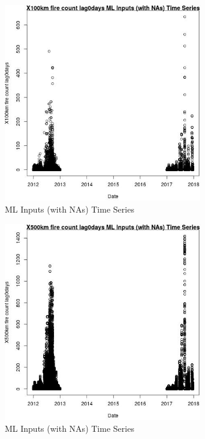 \begin{figure} 
\centering  
\includegraphics[width=0.77\textwidth]{Code_Outputs/Report_ML_input_PM25_Step4_part_e_de_duplicated_aves_compiled_2019-05-14wNAs_X100km_fire_count_lag0daysvDate.jpg} 
\caption{\label{fig:Report_ML_input_PM25_Step4_part_e_de_duplicated_aves_compiled_2019-05-14wNAsX100km_fire_count_lag0daysvDate}ML Inputs (with NAs) Time Series} 
\end{figure} 
 

\begin{figure} 
\centering  
\includegraphics[width=0.77\textwidth]{Code_Outputs/Report_ML_input_PM25_Step4_part_e_de_duplicated_aves_compiled_2019-05-14wNAs_X500km_fire_count_lag0daysvDate.jpg} 
\caption{\label{fig:Report_ML_input_PM25_Step4_part_e_de_duplicated_aves_compiled_2019-05-14wNAsX500km_fire_count_lag0daysvDate}ML Inputs (with NAs) Time Series} 
\end{figure} 
 

